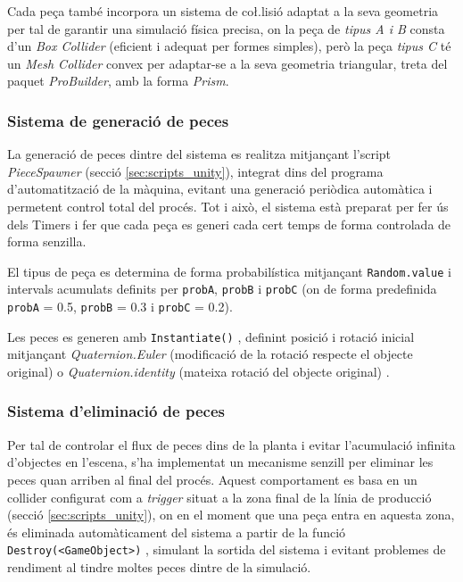 \documentclass[a4paper,11pt,DIV=13,headings=normal,abstract=true,twoside=semi]{article}
\begin{document}
Cada peça també incorpora un sistema de co\l.lisió \cite{UnityColliders} adaptat a la seva geometria per tal de garantir una simulació física precisa, on la peça de \emph{tipus A i B} consta d'un \emph{Box Collider} (eficient i adequat per formes simples), però la peça \emph{tipus C} té un \emph{Mesh Collider} convex per adaptar-se a la seva geometria triangular, treta del paquet \emph{ProBuilder}, amb la forma \emph{Prism}.


\subsubsection{Sistema de generació de peces}

La generació de peces dintre del sistema es realitza mitjançant l'script \emph{PieceSpawner} (secció \ref{sec:scripts_unity}), integrat dins del programa d'automatització de la màquina, evitant una generació periòdica automàtica i permetent control total del procés. Tot i això, el sistema està preparat per fer ús dels Timers i fer que cada peça es generi cada cert temps de forma controlada de forma senzilla. 

El tipus de peça es determina de forma probabilística mitjançant \texttt{Random.value} i intervals acumulats definits per \texttt{probA}, \texttt{probB} i \texttt{probC} (on de forma predefinida \texttt{probA} = 0.5, \texttt{probB} = 0.3 i \texttt{probC} = 0.2).


Les peces es generen amb \texttt{Instantiate()} \cite{UnityInstantiate}, definint posició i rotació inicial mitjançant \emph{Quaternion.Euler} (modificació de la rotació respecte el objecte original) o \emph{Quaternion.identity} (mateixa rotació del objecte original) \cite{UnityQuaternion}.


\subsubsection{Sistema d'eliminació de peces}

Per tal de controlar el flux de peces dins de la planta i evitar l'acumulació infinita d'objectes en l'escena, s'ha implementat un mecanisme senzill per eliminar les peces quan arriben al final del procés. Aquest comportament es basa en un collider configurat com a \emph{trigger} situat a la zona final de la línia de producció (secció \ref{sec:scripts_unity}), on en el moment que una peça entra en aquesta zona, és eliminada automàticament del sistema a partir de la funció \texttt{Destroy(<GameObject>)} \cite{UnityLearnDestroyI}, simulant la sortida del sistema i evitant problemes de rendiment al tindre moltes peces dintre de la simulació.
\end{document}
